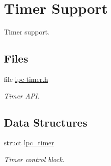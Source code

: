\hypertarget{group__lpc__timer}{}\section{Timer Support}
\label{group__lpc__timer}


Timer support.  


\subsection*{Files}
\begin{DoxyCompactItemize}
\item 
file \mbox{\hyperlink{lpc-timer_8h}{lpc-\/timer.\+h}}
\begin{DoxyCompactList}\small\item\em Timer A\+PI. \end{DoxyCompactList}\end{DoxyCompactItemize}
\subsection*{Data Structures}
\begin{DoxyCompactItemize}
\item 
struct \mbox{\hyperlink{structlpc__timer}{lpc\+\_\+timer}}
\begin{DoxyCompactList}\small\item\em Timer control block. \end{DoxyCompactList}\end{DoxyCompactItemize}
